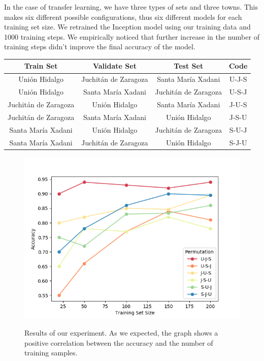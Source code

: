 In the case of transfer learning, we have three types of sets and three towns. This makes six different possible configurations, thus six different models for each training set size. We retrained the Inception model using our training data and 1000 training steps. We empirically noticed that further increase in the number of training steps didn't improve the final accuracy of the model.

\begin{center}
  \begin{tabular}{|c|c|c|c|}
    \hline
    Train Set              &Validate Set           &Test Set               &Code  \\ \hline
    Uni\'on Hidalgo        &Juchit\'an de Zaragoza &Santa Mar\'ia Xadani   &U-J-S \\ \hline
    Uni\'on Hidalgo        &Santa Mar\'ia Xadani   &Juchit\'an de Zaragoza &U-S-J \\ \hline
    Juchit\'an de Zaragoza &Uni\'on Hidalgo        &Santa Mar\'ia Xadani   &J-U-S \\ \hline
    Juchit\'an de Zaragoza &Santa Mar\'ia Xadani   &Uni\'on Hidalgo        &J-S-U \\ \hline
    Santa Mar\'ia Xadani   &Uni\'on Hidalgo        &Juchit\'an de Zaragoza &S-U-J \\ \hline
    Santa Mar\'ia Xadani   &Juchit\'an de Zaragoza &Uni\'on Hidalgo        &S-J-U \\
    \hline
  \end{tabular}
\end{center}


\begin{figure}[h]
  \centering
  \includegraphics[width=1\textwidth]{images/validation-plot.png}
  \label{fig:validaton-plot}
  \caption{Results of our experiment. As we expected, the graph shows a positive correlation between the accuracy and the number of training samples.}
\end{figure}


